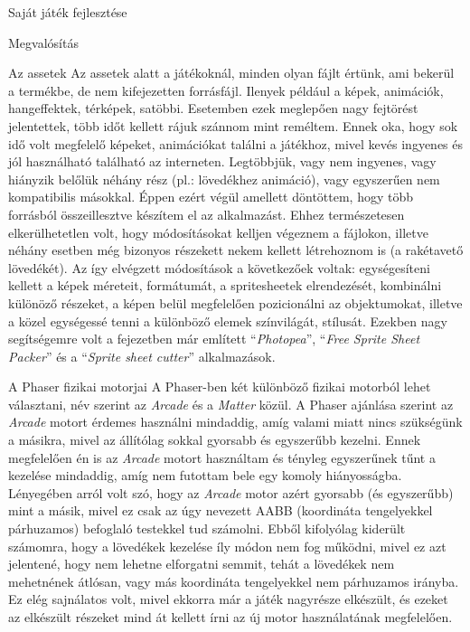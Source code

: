 \begin{MyChapter}{Saját játék fejlesztése}
\begin{MySection}{Megvalósítás}
		\begin{MySubSection}{Az assetek}
			Az assetek alatt a játékoknál, minden olyan fájlt értünk, ami bekerül a termékbe, de nem kifejezetten forrásfájl. Ilenyek például a képek, animációk, hangeffektek, térképek, satöbbi. Esetemben ezek meglepően nagy fejtörést jelentettek, több időt kellett rájuk szánnom mint reméltem. Ennek oka, hogy sok idő volt megfelelő képeket, animációkat találni a játékhoz, mivel kevés ingyenes és jól használható található az interneten. Legtöbbjük, vagy nem ingyenes, vagy hiányzik belőlük néhány rész (pl.: lövedékhez animáció), vagy egyszerűen nem kompatibilis másokkal. Éppen ezért végül amellett döntöttem, hogy több forrásból összeillesztve készítem el az alkalmazást. Ehhez természetesen elkerülhetetlen volt, hogy módosításokat kelljen végeznem a fájlokon, illetve néhány esetben még bizonyos részekett nekem kellett létrehoznom is (a rakétavető lövedékét). Az így elvégzett módosítások a következőek voltak: egységesíteni kellett a képek méreteit, formátumát, a spritesheetek elrendezését, kombinálni különöző részeket, a képen belül megfelelően pozicionálni az objektumokat, illetve a közel egységessé tenni a különböző elemek színvilágát, stílusát. Ezekben nagy segítségemre volt a  fejezetben már említett ``\textit{Photopea}'', ``\textit{Free Sprite Sheet Packer}'' és a ``\textit{Sprite sheet cutter}'' alkalmazások.
		\end{MySubSection}
		
		\begin{MySubSection}{A Phaser fizikai motorjai}
			A Phaser-ben két különböző fizikai motorból lehet választani, név szerint az \textit{Arcade} és a \textit{Matter} közül. A Phaser ajánlása szerint az \textit{Arcade} motort érdemes használni mindaddig, amíg valami miatt nincs szükségünk a másikra, mivel az állítólag sokkal gyorsabb és egyszerűbb kezelni. Ennek megfelelően én is az \textit{Arcade} motort használtam és tényleg egyszerűnek tűnt a kezelése mindaddig, amíg nem futottam bele egy komoly hiányosságba. Lényegében arról volt szó, hogy az \textit{Arcade} motor azért gyorsabb (és egyszerűbb) mint a másik, mivel ez csak az úgy nevezett AABB (koordináta tengelyekkel párhuzamos) befoglaló testekkel tud számolni. Ebből kifolyólag kiderült számomra, hogy a lövedékek kezelése íly módon nem fog működni, mivel ez azt jelentené, hogy nem lehetne elforgatni semmit, tehát a lövedékek nem mehetnének átlósan, vagy más koordináta tengelyekkel nem párhuzamos irányba. Ez elég sajnálatos volt, mivel ekkorra már a játék nagyrésze elkészült, és ezeket az elkészült részeket mind át kellett írni az új motor használatának megfelelően.
			

\end{MySubSection}
\end{MySection}
\end{MyChapter}
